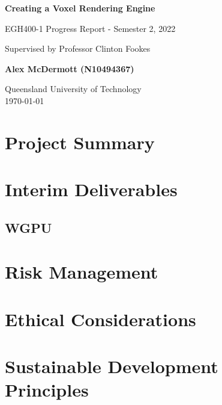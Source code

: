 \documentclass[titlepage]{article}
\begin{document}
\begin{titlepage}
    \begin{center}
        \vspace*{7cm}

        \Huge
        \textbf{Creating a Voxel Rendering Engine}

        \vspace{0.5cm}

        \Large
        EGH400-1 Progress Report - Semester 2, 2022

        \vspace{0.25cm}

        \large
        Supervised by Professor Clinton Fookes

        \vspace{0.5cm}

        \Large
        \textbf{Alex McDermott (N10494367)}

        \vfill

        \Large
        Queensland University of Technology\\
        \today
    \end{center}
\end{titlepage}

\tableofcontents
\listoffigures
\newpage

\section{Project Summary}

\section{Interim Deliverables}
\subsection{WGPU}

\section{Risk Management}

\section{Ethical Considerations}

\section{Sustainable Development Principles}
\end{document}
